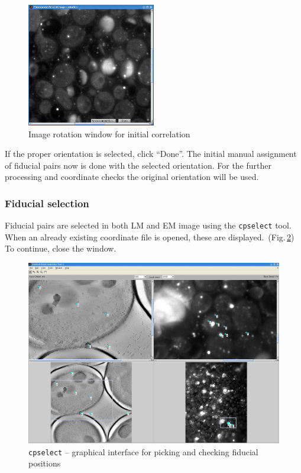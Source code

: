 \documentclass[10pt,a4paper,onepage,DIV12]{scrartcl}
\begin{document}
\begin{figure}[h]
 \centering
 \includegraphics[width=0.5\textwidth]{images/rotate.jpg}
 \caption{Image rotation window for initial correlation}
 \label{fig:rotate}
\end{figure}

If the proper orientation is selected, click ``Done''. The initial manual assignment of fiducial pairs now is done with the selected orientation. For the further processing and coordinate checks the original orientation will be used.


\subsubsection{Fiducial selection}
\label{sec:fiducials}

Fiducial pairs are selected in both LM and EM image using the \texttt{cpselect} tool. When an already existing coordinate file is opened, these are displayed.\, (Fig.\,\ref{fig:cpsel_fid1}) To continue, close the window.

\begin{figure}[ht!]
 \centering
 \includegraphics[width=.83\textwidth]{images/cpsel_fid1.jpg}
 \caption{\texttt{cpselect} -- graphical interface for picking and checking fiducial positions}
 \label{fig:cpsel_fid1}
\end{figure}
\end{document}
